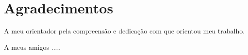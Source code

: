 \newpage

\chapter*{Agradecimentos}

A meu orientador pela compreensão e dedicação com que orientou meu 
trabalho.

A meus amigos .....

\newpage

$ $